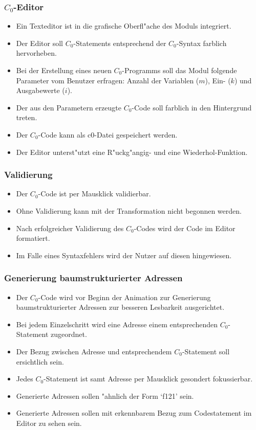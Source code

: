 \begin{itemize}
	\subsubsection{$C_0$-Editor}
	\begin{itemize}
    \item Ein Texteditor ist in die grafische Oberfl"ache des Moduls
    integriert.
    \item Der Editor soll $C_0$-Statements entsprechend der $C_0$-Syntax
    farblich hervorheben.
    \item Bei der Erstellung eines neuen $C_0$-Programms soll das Modul
    folgende Parameter vom Benutzer erfragen: Anzahl der Variablen ($m$), Ein- ($k$) und Ausgabewerte ($i$).
		\item Der aus den Parametern erzeugte $C_0$-Code soll farblich in den Hintergrund treten.
    \item Der $C_0$-Code kann als c0-Datei gespeichert werden.
	  \item Der Editor unterst"utzt eine R"uckg"angig- und eine Wiederhol-Funktion.
	\end{itemize}

	\subsubsection{Validierung}
  \begin{itemize}
    \item Der $C_0$-Code ist per Mausklick validierbar.
    \item Ohne Validierung kann mit der Transformation nicht begonnen werden.
		\item Nach erfolgreicher Validierung des $C_0$-Codes wird der Code im Editor formatiert.
    \item Im Falle eines Syntaxfehlers wird der Nutzer auf diesen hingewiesen.
  \end{itemize}
  
  \subsubsection{Generierung baumstrukturierter Adressen}
	\begin{itemize}
    \item Der $C_0$-Code wird vor Beginn der Animation zur Generierung
    baumstrukturierter Adressen zur besseren Lesbarkeit ausgerichtet.
    \item Bei jedem Einzelschritt wird eine Adresse einem entsprechenden
    $C_0$-Statement zugeordnet.
    \item Der Bezug zwischen Adresse und entsprechendem $C_0$-Statement soll
    ersichtlich sein.
    \item Jedes $C_0$-Statement ist samt Adresse per Mausklick gesondert
    fokussierbar.
    \item Generierte Adressen sollen "ahnlich der Form `f121' sein.
    \item Generierte Adressen sollen  mit erkennbarem Bezug zum Codestatement
    im Editor zu sehen sein.
	\end{itemize}


\end{itemize}
